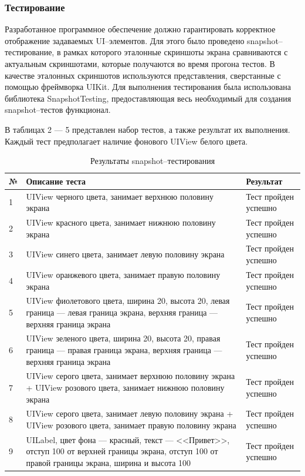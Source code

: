 \subsubsection{Тестирование}
Разработанное программное обеспечение должно гарантировать корректное отображение задаваемых UI--элементов.
Для этого было проведено snapshot--тестирование, в рамках которого эталонные скриншоты экрана сравниваются с актуальным скриншотами, которые получаются во время прогона тестов.
В качестве эталонных скриншотов используются представления, сверстанные с помощью фреймворка UIKit.
Для выполнения тестирования была использована библиотека SnapshotTesting, предоставляющая весь необходимый для создания snapshot--тестов функционал.

В таблицах 2 --- 5 представлен набор тестов, а также результат их выполнения.
Каждый тест предполагает наличие фонового UIView белого цвета.

\begin{table}[!htb]
 \label{table:tests1}
 \begin{center}
  \caption{Результаты snapshot--тестирования}
 \begin{tabular}{|p{0.6cm}|p{10cm}|p{5cm}|}
  \hline
   \bfseries № & \bfseries Описание теста & \bfseries Результат \\ \hline
   1 & UIView черного цвета, занимает верхнюю половину экрана & Тест пройден успешно  \\ \hline
   2 & UIView красного цвета, занимает нижнюю половину экрана & Тест пройден успешно  \\ \hline
   3 & UIView синего цвета, занимает левую половину экрана  & Тест пройден успешно  \\ \hline      
   4 & UIView оранжевого цвета, занимает правую половину экрана  & Тест пройден успешно  \\ \hline
   5 & UIView фиолетового цвета, ширина 20, высота 20, левая граница --- левая граница экрана, верхняя граница --- верхняя граница экрана & Тест пройден успешно  \\ \hline
   6 & UIView зеленого цвета, ширина 20, высота 20, правая граница --- правая граница экрана, верхняя граница --- верхняя граница экрана & Тест пройден успешно  \\ \hline
   7 & UIView серого цвета, занимает верхнюю половину экрана + UIView розового цвета, занимает нижнюю половину экрана & Тест пройден успешно  \\ \hline
   8 & UIView серого цвета, занимает левую половину экрана + UIView розового цвета, занимает правую половину экрана & Тест пройден успешно  \\ \hline
   9 & UILabel, цвет фона --- красный, текст --- <<Привет>>, отступ 100 от верхней границы экрана, отступ 100 от правой границы экрана, ширина и высота 100 & Тест пройден успешно  \\ \hline
  \end{tabular}
 \end{center}
\end{table}

